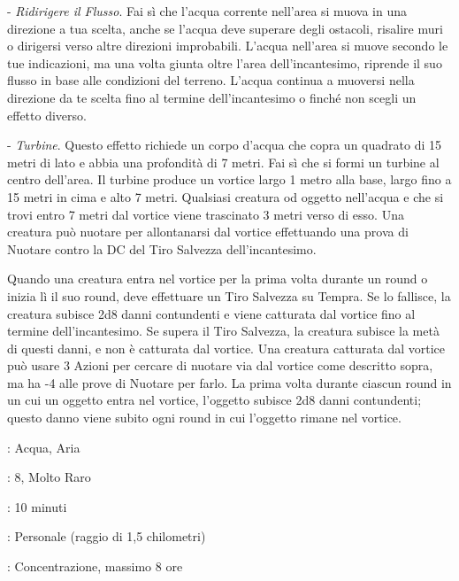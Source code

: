 \begin{multicols}{2}
- \emph{Ridirigere il Flusso}. Fai sì che l'acqua corrente nell'area si muova in una direzione a tua scelta, anche se l'acqua deve superare degli ostacoli, risalire muri o dirigersi verso altre direzioni improbabili. L'acqua nell'area si muove secondo le tue indicazioni, ma una volta giunta oltre l'area dell'incantesimo, riprende il suo flusso in base alle condizioni del terreno. L'acqua continua a muoversi nella direzione da te scelta fino al termine dell'incantesimo o finché non scegli un effetto diverso.

- \emph{Turbine}. Questo effetto richiede un corpo d'acqua che copra un quadrato di 15 metri di lato e abbia una profondità di 7 metri. Fai sì che si formi un turbine al centro dell'area. Il turbine produce un vortice largo 1 metro alla base, largo fino a 15 metri in cima e alto 7 metri. Qualsiasi creatura od oggetto nell'acqua e che si trovi entro 7 metri dal vortice viene trascinato 3 metri verso di esso. Una creatura può nuotare per allontanarsi dal vortice effettuando una prova di Nuotare contro la DC del Tiro Salvezza dell'incantesimo.

Quando una creatura entra nel vortice per la prima volta durante un round o inizia lì il suo round, deve effettuare un Tiro Salvezza su Tempra. Se lo fallisce, la creatura subisce 2d8 danni contundenti e viene catturata dal vortice fino al termine dell'incantesimo. Se supera il Tiro Salvezza, la creatura subisce la metà di questi danni, e non è catturata dal vortice. Una creatura catturata dal vortice può usare 3 Azioni per cercare di nuotare via dal vortice come descritto sopra, ma ha -4 alle prove di Nuotare per farlo. La prima volta durante ciascun round in un cui un oggetto entra nel vortice, l'oggetto subisce 2d8 danni contundenti; questo danno viene subito ogni round in cui l'oggetto rimane nel vortice.

\noindent\colorbox{OBSSgold!10}{
\begin{minipage}{0.95\linewidth}
\begin{description}[noitemsep, topsep=0pt, parsep=0pt, partopsep=0pt, leftmargin=0cm, labelwidth=1.3cm]
	\item[\textbf{Lista}]: Acqua, Aria
	\item[\textbf{Livello}]: 8, Molto Raro
	\item[\textbf{Lancio}]: 10 minuti
	\item[\textbf{Gittata}]: Personale (raggio di 1,5 chilometri)
	\item[\textbf{Durata}]: Concentrazione, massimo 8 ore
\end{description}
\end{minipage}}\smallskip


\end{multicols}
